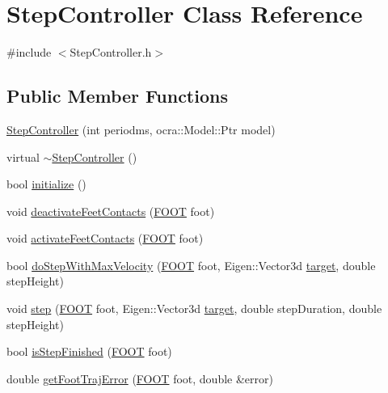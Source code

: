 \hypertarget{classStepController}{\section{\-Step\-Controller \-Class \-Reference}
\label{classStepController}
}


{\ttfamily \#include $<$\-Step\-Controller.\-h$>$}

\subsection*{\-Public \-Member \-Functions}
\begin{DoxyCompactItemize}
\item 
\hyperlink{classStepController_a80b7436dcb5c1d4a3e04f805b8f8f32a}{\-Step\-Controller} (int periodms, ocra\-::\-Model\-::\-Ptr model)
\item 
virtual \hyperlink{classStepController_ae2033c937309c104539b6758346529d5}{$\sim$\-Step\-Controller} ()
\item 
bool \hyperlink{classStepController_a8f061f201c651d920ca02f7daa07adfe}{initialize} ()
\item 
void \hyperlink{classStepController_ada72856c76030cc22ebb18f368f829f1}{deactivate\-Feet\-Contacts} (\hyperlink{utils_8h_a4b6a8e135f90bd56e5a57a60efb42529}{\-F\-O\-O\-T} foot)
\item 
void \hyperlink{classStepController_a6184693a199603c945250a58ceb8d9a2}{activate\-Feet\-Contacts} (\hyperlink{utils_8h_a4b6a8e135f90bd56e5a57a60efb42529}{\-F\-O\-O\-T} foot)
\item 
bool \hyperlink{classStepController_a1bfcb66d504440f0cc7383ad688dad5c}{do\-Step\-With\-Max\-Velocity} (\hyperlink{utils_8h_a4b6a8e135f90bd56e5a57a60efb42529}{\-F\-O\-O\-T} foot, \-Eigen\-::\-Vector3d \hyperlink{classStepController_a588d5b149eb4a6877e89ecff37d0f91d}{target}, double step\-Height)
\item 
void \hyperlink{classStepController_ab8ca9c17211622c4902ce8adc89f9ca5}{step} (\hyperlink{utils_8h_a4b6a8e135f90bd56e5a57a60efb42529}{\-F\-O\-O\-T} foot, \-Eigen\-::\-Vector3d \hyperlink{classStepController_a588d5b149eb4a6877e89ecff37d0f91d}{target}, double step\-Duration, double step\-Height)
\item 
bool \hyperlink{classStepController_ac8e210ab8acf9c7b91bce3396fff20c8}{is\-Step\-Finished} (\hyperlink{utils_8h_a4b6a8e135f90bd56e5a57a60efb42529}{\-F\-O\-O\-T} foot)
\item 
double \hyperlink{classStepController_a07a961e8c82124d7e88416a3dcab8056}{get\-Foot\-Traj\-Error} (\hyperlink{utils_8h_a4b6a8e135f90bd56e5a57a60efb42529}{\-F\-O\-O\-T} foot, double \&error)

\end{DoxyCompactItemize}
